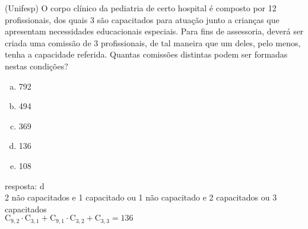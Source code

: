 \begin{ex}
 	(Unifesp) O corpo clínico da pediatria de certo hospital é composto por 12 profissionais, dos quais 3 são capacitados para atuação junto a crianças que apresentam necessidades educacionais especiais. Para  fins de assessoria, deverá ser criada uma comissão de 3 profissionais, de tal maneira que um deles, pelo menos, tenha a capacidade referida. Quantas comissões distintas podem ser formadas nestas condições?
    \begin{enumerate}[(a)]
    \item 792
    \item 494
    \item 369
    \item 136
    \item 108
    \end{enumerate}
      \begin{sol}
       resposta: d \\
       2 não capacitados e 1 capacitado ou 1 não capacitado e 2 capacitados ou 3 capacitados \\
       $\mathrm{C}_{9,2}\cdot\mathrm{C}_{3,1}+\mathrm{C}_{9,1}\cdot\mathrm{C}_{3,2}+\mathrm{C}_{3,3}= 136$
      \end{sol}
\end{ex}